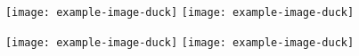 \documentclass{beamer}
\begin{document}
\begin{frame}
    \begin{columns}[T,onlytextwidth]
        \begin{column}{.2\textwidth}
            \lipsum
        \end{column}
        \begin{column}{.75\textwidth}
            \texttt{[image: example-image-duck]}\hfill
            \texttt{[image: example-image-duck]}

            \texttt{[image: example-image-duck]}\hfill
            \texttt{[image: example-image-duck]}
        \end{column}
    \end{columns}
\end{frame} 
\end{document}
